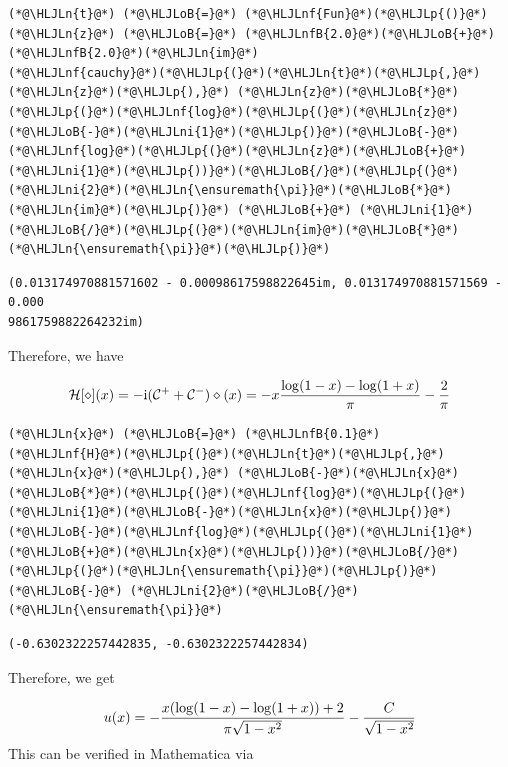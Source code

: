 \documentclass[12pt,a4paper]{article}
\newcommand{\HLJLn}[1]{#1}
\newcommand{\HLJLnf}[1]{\textcolor[RGB]{66,102,213}{#1}}
\newcommand{\HLJLnfB}[1]{\textcolor[RGB]{59,151,46}{#1}}
\newcommand{\HLJLni}[1]{\textcolor[RGB]{59,151,46}{#1}}
\newcommand{\HLJLoB}[1]{\textcolor[RGB]{102,102,102}{\textbf{#1}}}
\newcommand{\HLJLp}[1]{#1}
\def\I{ {\rm i} }
\def\CC{ {\cal C} }
\def\HH{ {\cal H} }
\begin{document}
\begin{lstlisting}
(*@\HLJLn{t}@*) (*@\HLJLoB{=}@*) (*@\HLJLnf{Fun}@*)(*@\HLJLp{()}@*)
(*@\HLJLn{z}@*) (*@\HLJLoB{=}@*) (*@\HLJLnfB{2.0}@*)(*@\HLJLoB{+}@*)(*@\HLJLnfB{2.0}@*)(*@\HLJLn{im}@*)
(*@\HLJLnf{cauchy}@*)(*@\HLJLp{(}@*)(*@\HLJLn{t}@*)(*@\HLJLp{,}@*) (*@\HLJLn{z}@*)(*@\HLJLp{),}@*) (*@\HLJLn{z}@*)(*@\HLJLoB{*}@*)(*@\HLJLp{(}@*)(*@\HLJLnf{log}@*)(*@\HLJLp{(}@*)(*@\HLJLn{z}@*)(*@\HLJLoB{-}@*)(*@\HLJLni{1}@*)(*@\HLJLp{)}@*)(*@\HLJLoB{-}@*)(*@\HLJLnf{log}@*)(*@\HLJLp{(}@*)(*@\HLJLn{z}@*)(*@\HLJLoB{+}@*)(*@\HLJLni{1}@*)(*@\HLJLp{))}@*)(*@\HLJLoB{/}@*)(*@\HLJLp{(}@*)(*@\HLJLni{2}@*)(*@\HLJLn{\ensuremath{\pi}}@*)(*@\HLJLoB{*}@*)(*@\HLJLn{im}@*)(*@\HLJLp{)}@*) (*@\HLJLoB{+}@*) (*@\HLJLni{1}@*)(*@\HLJLoB{/}@*)(*@\HLJLp{(}@*)(*@\HLJLn{im}@*)(*@\HLJLoB{*}@*)(*@\HLJLn{\ensuremath{\pi}}@*)(*@\HLJLp{)}@*)
\end{lstlisting}

\begin{lstlisting}
(0.013174970881571602 - 0.00098617598822645im, 0.013174970881571569 - 0.000
9861759882264232im)
\end{lstlisting}


Therefore, we have

\[
\HH[\diamond](x) = -\I (\CC^+ + \CC^-) \diamond(x) = -x {\log(1-x) - \log(1+x) \over \pi} -{2 \over \pi}
\]

\begin{lstlisting}
(*@\HLJLn{x}@*) (*@\HLJLoB{=}@*) (*@\HLJLnfB{0.1}@*)
(*@\HLJLnf{H}@*)(*@\HLJLp{(}@*)(*@\HLJLn{t}@*)(*@\HLJLp{,}@*)(*@\HLJLn{x}@*)(*@\HLJLp{),}@*) (*@\HLJLoB{-}@*)(*@\HLJLn{x}@*)(*@\HLJLoB{*}@*)(*@\HLJLp{(}@*)(*@\HLJLnf{log}@*)(*@\HLJLp{(}@*)(*@\HLJLni{1}@*)(*@\HLJLoB{-}@*)(*@\HLJLn{x}@*)(*@\HLJLp{)}@*)(*@\HLJLoB{-}@*)(*@\HLJLnf{log}@*)(*@\HLJLp{(}@*)(*@\HLJLni{1}@*)(*@\HLJLoB{+}@*)(*@\HLJLn{x}@*)(*@\HLJLp{))}@*)(*@\HLJLoB{/}@*)(*@\HLJLp{(}@*)(*@\HLJLn{\ensuremath{\pi}}@*)(*@\HLJLp{)}@*) (*@\HLJLoB{-}@*) (*@\HLJLni{2}@*)(*@\HLJLoB{/}@*)(*@\HLJLn{\ensuremath{\pi}}@*)
\end{lstlisting}

\begin{lstlisting}
(-0.6302322257442835, -0.6302322257442834)
\end{lstlisting}


Therefore, we get

\[
u(x) = - {x(\log(1-x) - \log(1+x))+2 \over  \pi\sqrt{1-x^2}} - {C \over \sqrt{1-x^2}}
\]
This can be verified in Mathematica via
\end{document}
